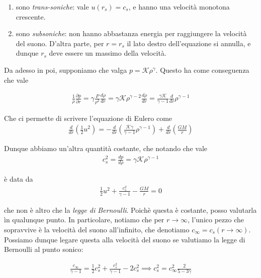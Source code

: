 \documentclass{report}
\begin{document}
\begin{enumerate}
    \item sono \emph{trans-soniche}: vale \(u(r_s) =c_s\), e hanno una velocità monotona crescente. 
    \item sono \emph{subsoniche}: non hanno abbastanza energia per raggiungere la velocità del suono. D'altra parte, per \(r =r_s\) il lato destro dell'equazione si annulla, e dunque \(r_s\) deve essere un massimo della velocità.  
\end{enumerate}

Da adesso in poi, supponiamo che valga \(p = \mathcal{K}\rho^\gamma\). Questo ha come conseguenza che vale 

\begin{align}
    \frac{1}{\rho}\frac{\partial p}{\partial r} = \gamma \frac{P}{\rho^2}\frac{d\rho}{dr} = \gamma \mathcal{K}\rho^{\gamma-2}\frac{d\rho}{dr} = \frac{\gamma\mathcal{K}}{\gamma -1}\frac{d}{dr}\rho^{\gamma -1}
\end{align}

Che ci permette di scrivere l'equazione di Eulero come 
\begin{align}
    \frac{d}{dr}\left(\frac{1}{2}u^2\right) = -\frac{d}{dr}\left(\frac{\mathcal{K}\gamma}{\gamma -1}\rho^{\gamma -1}\right) + \frac{d}{dr}\left(\frac{GM}{r}\right)
\end{align}

Dunque abbiamo un'altra quantità costante, che notando che vale 
\begin{align}
    c_s^2 = \frac{dp}{d\rho} = \gamma \mathcal{K}\rho^{\gamma -1}
\end{align}

è data da 
\begin{align}
    \frac{1}{2}u^2 + \frac{c_s^2}{\gamma -1} - \frac{GM}{r} =0
\end{align}

che non è altro che la \emph{legge di Bernoulli}. Poichè questa è costante, posso valutarla ìn qualunque punto. In particolare, notiamo che per \(r \rightarrow \infty\), l'unico pezzo che sopravvive è la velocità del suono all'infinito, che denotiamo \(c_\infty = c_s(r \rightarrow \infty)\). Possiamo dunque legare questa alla velocità del suono se valutiamo la legge di Bernoulli al punto sonico: 

\begin{align}
    \frac{c_\infty}{\gamma -1}= \frac{1}{2}c_s^2 + \frac{c_s^2}{\gamma -1} - 2c_s^2 \implies c_s^2 = c_\infty^2 \frac{2}{5 - 3\gamma}
\end{align}
\end{document}
